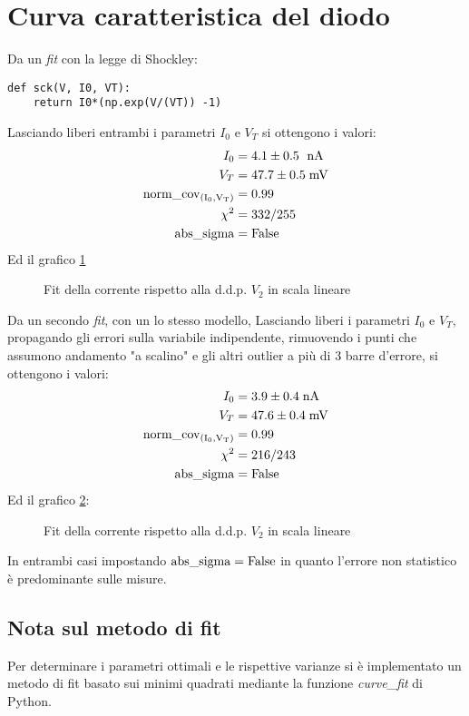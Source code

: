 \documentclass{article}[a4paper, oneside ,11pt]
\begin{document}
\section{Curva caratteristica del diodo}
Da un \emph{fit} con la legge di Shockley:
\begin{lstlisting}
def sck(V, I0, VT):
    return I0*(np.exp(V/(VT)) -1)
\end{lstlisting}
Lasciando liberi entrambi i parametri $I_{0}$ e $V_{T}$ si ottengono i valori:
\begin{align*}
I_{0} &= 4.1 \pm 0.5 \ \; \rm nA \\
V_{T} &= 47.7 \pm 0.5 \; \rm mV \\  
\rm{norm\_cov}_{(I_{0}, V_{T})} &= 0.99 \\ 
\chi^2 &= 332/255 \\
\rm{abs\_sigma} &= \rm False
\end{align*}
Ed il grafico \ref{plt:did}\\
\begin{figure}[!htb]
	\centering 
 		\scalebox{0.9}{}
 	\caption{Fit della corrente rispetto alla d.d.p. $V_2$ in scala lineare \label{plt:did}}
\end{figure}
Da un secondo \emph{fit}, con un lo stesso modello,
Lasciando liberi i parametri $I_{0}$ e $V_{T}$, propagando gli errori sulla variabile indipendente, rimuovendo i punti che assumono andamento "a scalino" e gli altri outlier a più di 3 barre d'errore, si ottengono i valori:
\begin{align*}
I_{0} &= 3.9 \pm 0.4 \; \rm nA \\
V_{T} &= 47.6 \pm 0.4 \; \rm mV \\  
\rm{norm\_cov}_{(I_{0}, V_{T})} &= 0.99 \\ 
\chi^2 &= 216/243 \\
\rm{abs\_sigma} &= \rm False
\end{align*}
Ed il grafico \ref{plt:did_out}:\\
\begin{figure}[!htb]
	\centering 
 		\scalebox{0.9}{}
 	\caption{Fit della corrente rispetto alla d.d.p. $V_2$ in scala lineare \label{plt:did_out}}
\end{figure}
In entrambi casi impostando $\rm{abs\_sigma} = \rm False$ in quanto l'errore non statistico è predominante sulle misure.
\subsection{Nota sul metodo di fit}
Per determinare i parametri ottimali e le rispettive varianze si \`e implementato un metodo di fit basato sui minimi quadrati mediante la funzione \emph{curve\_fit} di Python.
\medskip


\end{document}
